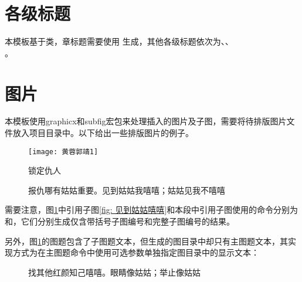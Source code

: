 \documentclass[print, doctor, vlined]{DissertUESTC}
\begin{document}
	\section{各级标题}
	
	本模板基于类，章标题需要使用 生成，其他各级标题依次为、、\\ 。
	
	\section{图片}
	
	本模板使用graphicx和subfig宏包来处理插入的图片及子图，需要将待排版图片文件放入项目目录中。以下给出一些排版图片的例子。
	
	\begin{figure}[!htb]
		\centering
		\texttt{[image: 黄蓉郭靖1]}
		\caption{锁定仇人}
	\end{figure}
	
	\begin{figure}[!htb]
		\centering
		\hfill
		\caption[报仇哪有姑姑重要]{报仇哪有姑姑重要。见到姑姑我嘻嘻；姑姑见我不嘻嘻} \label{fig: 报仇哪有姑姑重要}
	\end{figure}
	

	需要注意，图\ref{fig: 报仇哪有姑姑重要}中引用子图\ref{fig: 见到姑姑嘻嘻}和本段中引用子图使用的命令分别为和，它们分别生成仅含带括号子图编号和完整子图编号的结果。
	
	另外，图\ref{fig: 报仇哪有姑姑重要}的图题包含了子图题文本，但生成的图目录中却只有主图题文本，其实现方式为在主图题命令中使用可选参数单独指定图目录中的显示文本：
	
	\begin{figure}[!htb]
		\centering
		\hfill
		\subfloat[]{
			\texttt{[image: 程英3]}
			\label{fig: 程英3}
		}
		\caption{找其他红颜知己嘻嘻。眼睛像姑姑；举止像姑姑} \label{fig: 红颜知己}
	\end{figure}
	
\end{document}
